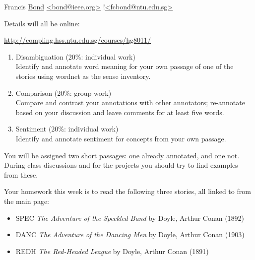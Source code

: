\documentclass[a4paper,landscape,headrule,footrule,xetex,25pt]{foils}
\begin{document}
\begin{description}\addtolength{\itemsep}{-5mm}
\item [Coordinator]  Francis \ul{Bond} 
{\small \url{<bond@ieee.org>} !\url{<fcbond@ntu.edu.sg>}}
\item Details will all be  online:
  \begin{center}
    \url{http://compling.hss.ntu.edu.sg/courses/hg8011/}    
  \end{center}
\end{description}

\begin{enumerate}
\item Disambiguation (20\%: individual work)
  \\ Identify and annotate word meaning for your own passage of one of the stories using wordnet as the sense inventory.
\item Comparison (20\%: group work)
  \\ Compare and contrast your annotations with other annotators; re-annotate based on your discussion and leave comments for at least five words.
\item Sentiment (20\%: individual work)
  \\ Identify and annotate sentiment for concepts from your own passage.
\end{enumerate}

You will be assigned two short passages: one already annotated, and
one not.  During class discussions and for the projects you should try
to find examples from these.

Your homework this week is to read the following three stories, all
linked to from the main page:
\begin{itemize}\addtolength{\itemsep}{-2ex}
\item SPEC \textit{The Adventure of the Speckled Band} by
  Doyle, Arthur Conan (1892)
\item DANC \textit{The Adventure
  of the Dancing Men} by Doyle, Arthur Conan (1903) 
\item REDH \textit{The  Red-Headed League}
   by Doyle, Arthur Conan (1891) 
\end{itemize}
\end{document}
